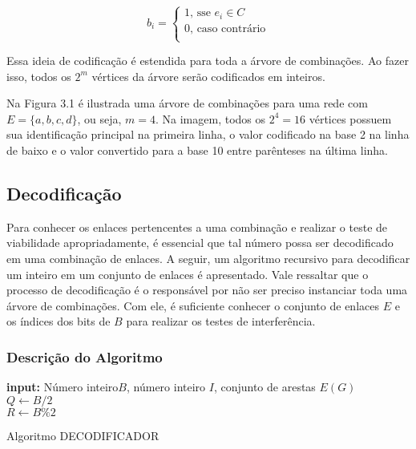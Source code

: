 \[ b_i =
\begin{cases}
	1	\text{, sse } e_i \in C\\
	0	\text{, caso contrário}\\
  \end{cases}
\]

Essa ideia de codificação é estendida para toda a árvore de combinações. Ao fazer isso, todos os $2^m$ vértices da árvore serão codificados em inteiros.


Na Figura 3.1 é ilustrada uma árvore de combinações para uma rede com $E=\{a,b,c,d\}$, ou seja, $m=4$. Na imagem, todos os $2^4 = 16$ vértices possuem sua identificação principal na primeira linha, o valor codificado na base 2 na linha de baixo e o valor convertido para a base 10 entre parênteses na última linha.

\subsection{Decodificação}

Para conhecer os enlaces pertencentes a uma combinação e realizar o teste de viabilidade apropriadamente, é essencial que tal número possa ser decodificado em uma combinação de enlaces. A seguir, um algoritmo recursivo para decodificar um inteiro em um conjunto de enlaces é apresentado. Vale ressaltar que o processo de decodificação é o responsável por não ser preciso instanciar toda uma árvore de combinações. Com ele, é suficiente conhecer o conjunto de enlaces $E$ e os índices dos bits de $B$ para realizar os testes de interferência.

\subsubsection{Descrição do Algoritmo}

\begin{algorithm}[h]
	\SetVline
	{\bf input:} Número inteiro$B$, número inteiro $I$, conjunto de arestas $E(G)$\\
	$Q \leftarrow B/2$\\
	$R \leftarrow B\%2$\\
\caption{Algoritmo DECODIFICADOR}
\label{alg:decodificador}
\end{algorithm}

